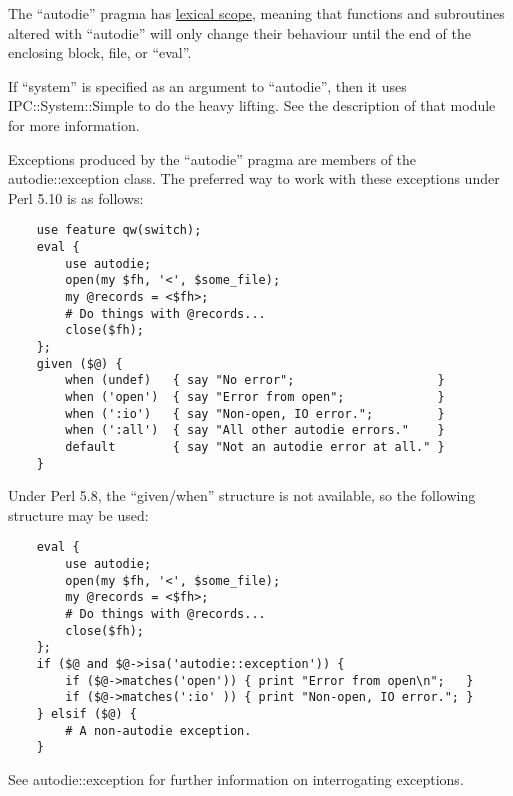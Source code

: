 \documentclass[]{article}
\renewcommand{\emph}[1]{\underline{#1}}
\begin{document}
The ``autodie'' pragma has \emph{lexical scope}, meaning that functions
and subroutines altered with ``autodie'' will only change their
behaviour until the end of the enclosing block, file, or ``eval''.

If ``system'' is specified as an argument to ``autodie'', then it uses
IPC::System::Simple to do the heavy lifting. See the description of that
module for more information.


Exceptions produced by the ``autodie'' pragma are members of the
autodie::exception class. The preferred way to work with these
exceptions under Perl 5.10 is as follows:

\begin{verbatim}
    use feature qw(switch);
    eval {
        use autodie;
        open(my $fh, '<', $some_file);
        my @records = <$fh>;
        # Do things with @records...
        close($fh);
    };
    given ($@) {
        when (undef)   { say "No error";                    }
        when ('open')  { say "Error from open";             }
        when (':io')   { say "Non-open, IO error.";         }
        when (':all')  { say "All other autodie errors."    }
        default        { say "Not an autodie error at all." }
    }
\end{verbatim}

Under Perl 5.8, the ``given/when'' structure is not available, so the
following structure may be used:

\begin{verbatim}
    eval {
        use autodie;
        open(my $fh, '<', $some_file);
        my @records = <$fh>;
        # Do things with @records...
        close($fh);
    };
    if ($@ and $@->isa('autodie::exception')) {
        if ($@->matches('open')) { print "Error from open\n";   }
        if ($@->matches(':io' )) { print "Non-open, IO error."; }
    } elsif ($@) {
        # A non-autodie exception.
    }
\end{verbatim}

See autodie::exception for further information on interrogating
exceptions.

\end{document}
